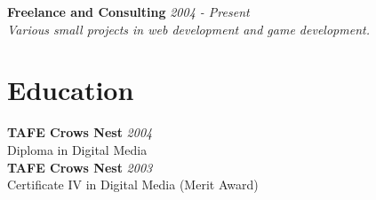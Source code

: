 \documentclass[a4paper,10pt]{article}
\begin{document}
\textbf{Freelance and Consulting} \hfill \textit{2004 - Present} \\
\textit{Various small projects in web development and game development.}

\section*{Education}

\textbf{TAFE Crows Nest} \hfill \textit{2004} \\
Diploma in Digital Media \\
\textbf{TAFE Crows Nest} \hfill \textit{2003} \\
Certificate IV in Digital Media (Merit Award)
\end{document}
